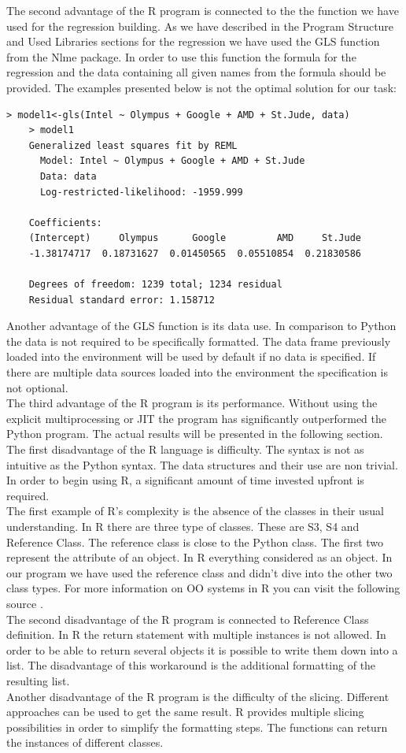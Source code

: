 \documentclass[
  twoside,
  11pt, a4paper,
  footinclude=true,
  headinclude=true,
  cleardoublepage=empty
]{scrreprt}
\begin{document}
    The second advantage of the R program is connected to the the function we have used for the regression building. As we have described in the Program Structure and Used Libraries sections for the regression we have used the GLS function from the Nlme package. In order to use this function the formula for the regression and the data containing all given names from the formula should be provided. The examples presented below is not the optimal solution for our task:
    \begin{lstlisting}[basicstyle=\footnotesize]
    > model1<-gls(Intel ~ Olympus + Google + AMD + St.Jude, data)
    > model1
    Generalized least squares fit by REML
      Model: Intel ~ Olympus + Google + AMD + St.Jude 
      Data: data 
      Log-restricted-likelihood: -1959.999
    
    Coefficients:
    (Intercept)     Olympus      Google         AMD     St.Jude 
    -1.38174717  0.18731627  0.01450565  0.05510854  0.21830586 
    
    Degrees of freedom: 1239 total; 1234 residual
    Residual standard error: 1.158712
    \end{lstlisting}
    Another advantage of the GLS function is its data use. In comparison to Python the data is not required to be specifically formatted. The data frame previously loaded into the environment will be used by default if no data is specified. If there are multiple data sources loaded into the environment the specification is not optional.\\
    The third advantage of the R program is its performance. Without using the explicit multiprocessing or JIT the program has significantly outperformed the Python program. The actual results will be presented in the following section.\\
    The first disadvantage of the R language is difficulty. The syntax is not as intuitive as the Python syntax. The data structures and their use are non trivial. In order to begin using R, a significant amount of time invested upfront is required.\\
    The first example of R's complexity is the absence of the classes in their usual understanding. In R there are three type of classes. These are S3, S4 and Reference Class. The reference class is close to the Python class. The first two represent the attribute of an object. In R everything considered as an object. In our program we have used the reference class and didn't dive into the other two class types. For more information on OO systems in R you can visit the following source \cite{r:OO}. \\
    The second disadvantage of the R program is connected to Reference Class definition. In R the return statement with multiple instances is not allowed. In order to be able to return several objects it is possible to write them down into a list. The disadvantage of this workaround is the additional formatting of the resulting list.\\
    Another disadvantage of the R program is the difficulty of the slicing. Different approaches can be used to get the same result. R provides multiple slicing possibilities in order to simplify the formatting steps. The functions can return the instances of different classes.
\end{document}
